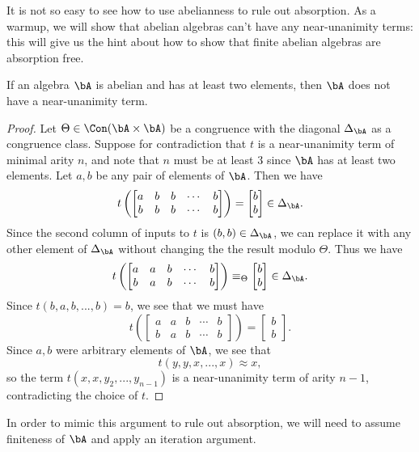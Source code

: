 It is not so easy to see how to use abelianness to rule out absorption. As a warmup, we will show that abelian algebras can't have any near-unanimity terms: this will give us the hint about how to show that finite abelian algebras are absorption free.

\begin{prop} If an algebra $\bA$ is abelian and has at least two elements, then $\bA$ does not have a near-unanimity term.
\end{prop}
\begin{proof} Let $\Theta \in \Con(\bA \times \bA)$ be a congruence with the diagonal $\Delta_{\bA}$ as a congruence class. Suppose for contradiction that $t$ is a near-unanimity term of minimal arity $n$, and note that $n$ must be at least $3$ since $\bA$ has at least two elements. Let $a,b$ be any pair of elements of $\bA$. Then we have
\[
t\left(\begin{bmatrix} a & b & b & \cdots & b\\ b & b & b & \cdots & b\end{bmatrix}\right) = \begin{bmatrix} b\\ b\end{bmatrix} \in \Delta_{\bA}.
\]
Since the second column of inputs to $t$ is $(b,b) \in \Delta_\bA$, we can replace it with any other element of $\Delta_\bA$ without changing the the result modulo $\Theta$. Thus we have
\[
t\left(\begin{bmatrix} a & a & b & \cdots & b\\ b & a & b & \cdots & b\end{bmatrix}\right) \equiv_\Theta \begin{bmatrix} b\\ b\end{bmatrix} \in \Delta_{\bA}.
\]
Since $t(b,a,b,...,b) = b$, we see that we must have
\[
t\left(\begin{bmatrix} a & a & b & \cdots & b\\ b & a & b & \cdots & b\end{bmatrix}\right) = \begin{bmatrix} b\\ b\end{bmatrix}.
\]
Since $a,b$ were arbitrary elements of $\bA$, we see that
\[
t(y,y,x,...,x) \approx x,
\]
so the term $t(x,x,y_2,...,y_{n-1})$ is a near-unanimity term of arity $n-1$, contradicting the choice of $t$.
\end{proof}

In order to mimic this argument to rule out absorption, we will need to assume finiteness of $\bA$ and apply an iteration argument.


